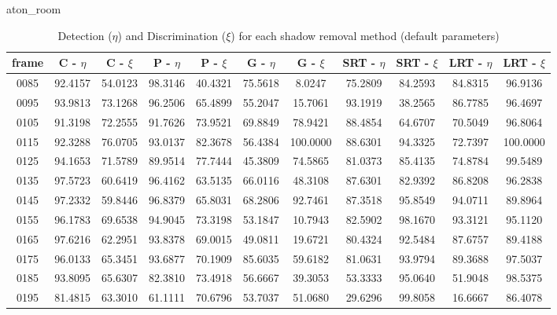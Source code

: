 \begin{appendices}
\begin{table}
\centering
\caption{aton\_room}
\caption*{Detection ($\eta$) and Discrimination ($\xi$) for each shadow removal method (default parameters)}
\begin{tabular}{ |c|c|c|c|c|c|c|c|c|c|c| }
	\hline
\textbf{frame} &  \textbf{C - $\eta$} &  \textbf{C - $\xi$} &  \textbf{P - $\eta$} &  \textbf{P - $\xi$} &  \textbf{G - $\eta$} &  \textbf{G - $\xi$} &  \textbf{SRT - $\eta$} &  \textbf{SRT - $\xi$} &  \textbf{LRT - $\eta$} &  \textbf{LRT - $\xi$} \\
\hline
\hline
0085 &  92.4157 &  54.0123 &   98.3146 &  40.4321 &   75.5618 &  8.0247 &   75.2809 &  84.2593 &   84.8315 &  96.9136    \\
\hline
0095 &  93.9813 &  73.1268 &   96.2506 &  65.4899 &   55.2047 &  15.7061 &   93.1919 &  38.2565 &   86.7785 &  96.4697    \\
\hline
0105 &  91.3198 &  72.2555 &   91.7626 &  73.9521 &   69.8849 &  78.9421 &   88.4854 &  64.6707 &   70.5049 &  96.8064    \\
\hline
0115 &  92.3288 &  76.0705 &   93.0137 &  82.3678 &   56.4384 &  100.0000 &   88.6301 &  94.3325 &   72.7397 &  100.0000    \\
\hline
0125 &  94.1653 &  71.5789 &   89.9514 &  77.7444 &   45.3809 &  74.5865 &   81.0373 &  85.4135 &   74.8784 &  99.5489    \\
\hline
0135 &  97.5723 &  60.6419 &   96.4162 &  63.5135 &   66.0116 &  48.3108 &   87.6301 &  82.9392 &   86.8208 &  96.2838    \\
\hline
0145 &  97.2332 &  59.8446 &   96.8379 &  65.8031 &   68.2806 &  92.7461 &   87.3518 &  95.8549 &   94.0711 &  89.8964    \\
\hline
0155 &  96.1783 &  69.6538 &   94.9045 &  73.3198 &   53.1847 &  10.7943 &   82.5902 &  98.1670 &   93.3121 &  95.1120    \\
\hline
0165 &  97.6216 &  62.2951 &   93.8378 &  69.0015 &   49.0811 &  19.6721 &   80.4324 &  92.5484 &   87.6757 &  89.4188    \\
\hline
0175 &  96.0133 &  65.3451 &   93.6877 &  70.1909 &   85.6035 &  59.6182 &   81.0631 &  93.9794 &   89.3688 &  97.5037    \\
\hline
0185 &  93.8095 &  65.6307 &   82.3810 &  73.4918 &   56.6667 &  39.3053 &   53.3333 &  95.0640 &   51.9048 &  98.5375    \\
\hline
0195 &  81.4815 &  63.3010 &   61.1111 &  70.6796 &   53.7037 &  51.0680 &   29.6296 &  99.8058 &   16.6667 &  86.4078    \\

\end{tabular}
\end{table}
\end{appendices}
